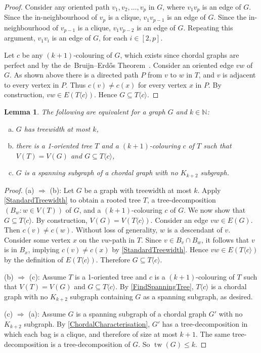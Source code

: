 \documentclass[a4paper,11pt]{article}
\theoremstyle{plain}
\newtheorem{lem}[thm]{Lemma}
\theoremstyle{definition}
\renewcommand{\leq}{\leqslant}
\DeclareMathOperator{\tw}{tw}
\newcommand{\NN}{\mathbb{N}}
\newcommand{\GGG}[2]{#1\langle{#2}\rangle}
\begin{document}
\begin{proof}
Consider any oriented path $v_1,v_2,\dots,v_p$ in $G$, where $v_1v_p$ is an edge of $G$. Since the in-neighbourhood of $v_p$ is a clique, $v_1v_{p-1}$ is an edge of $G$. Since the in-neighbourhood of $v_{p-1}$ is a clique, $v_1v_{p-2}$ is an edge of $G$. Repeating this argument, $v_1v_i$ is an edge of $G$, for each $i\in[2,p]$. 

Let $c$ be any $(k+1)$-colouring of $G$, which exists since chordal graphs are perfect and by the de~Bruijn--Erd\H{o}s Theorem~\citep{dBE51}. Consider an oriented edge $vw$ of $G$. As shown above there is a directed path $P$ from $v$ to $w$ in $T$, and $v$ is adjacent to every vertex in $P$. Thus $c(v)\neq c(x)$ for every vertex $x$ in $P$. By construction, $vw\in E(\GGG{T}{c})$. Hence $G\subseteq \GGG{T}{c}$.
\end{proof}


\begin{lem}
\label{TreewidthCharacterisation}
The following are equivalent for a graph $G$ and $k\in\NN$:
\begin{enumerate}[(a)]
\item $G$ has treewidth at most $k$, 
\item there is a 1-oriented tree $T$ and a $(k+1)$-colouring $c$ of $T$ such that $V(T)=V(G)$ and $G\subseteq \GGG{T}{c}$, 
\item $G$ is a spanning subgraph of a chordal graph with no $K_{k+2}$ subgraph.
\end{enumerate}
\end{lem}

\begin{proof}
(a) $\Longrightarrow$ (b): 
Let $G$ be a graph with treewidth at most $k$. Apply \cref{StandardTreewidth} to obtain a rooted tree $T$, a tree-decomposition $(B_w:w\in V(T))$ of $G$, and a $(k+1)$-colouring $c$ of $G$. We now show that $G\subseteq \GGG{T}{c}$. By construction, $V(G) = V(\GGG{T}{c})$. Consider an edge $vw\in E(G)$. Then $c(v)\neq c(w)$. Without loss of generality, $w$ is a descendant of $v$. Consider some vertex $x$ on the $vw$-path in $T$. Since $v\in B_v\cap B_w$, it follows that $v$ is in $B_x$, implying $c(v)\neq c(x)$ by \cref{StandardTreewidth}. Hence $vw\in E(\GGG{T}{c})$ by the definition of $E(\GGG{T}{c})$. Therefore $G\subseteq \GGG{T}{c}$. 

(b) $\Longrightarrow$ (c): Assume $T$ is a 1-oriented tree and $c$ is a $(k+1)$-colouring of $T$ such that $V(T)=V(G)$ and $G\subseteq \GGG{T}{c}$. 
By \cref{FindSpanningTree}, $\GGG{T}{c}$ is a chordal graph with no $K_{k+2}$ subgraph containing $G$ as a spanning subgraph, as desired. 

(c) $\Longrightarrow$ (a): Assume $G$ is a spanning subgraph of a chordal graph $G'$ with no $K_{k+2}$ subgraph. By \cref{ChordalCharacterisation}, $G'$ has a tree-decomposition in which each bag is a clique, and therefore of size at most $k+1$. The same tree-decomposition is a tree-decomposition of $G$. So $\tw(G)\leq k$.
\end{proof}
\end{document}
